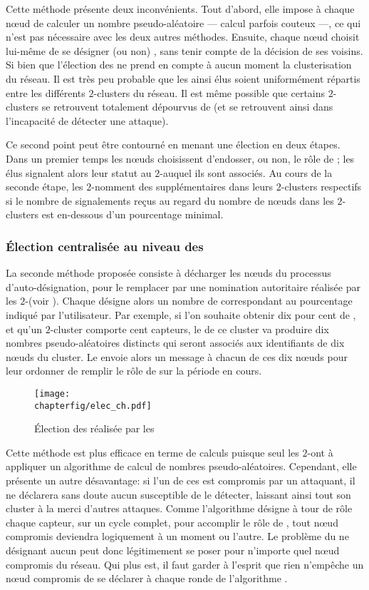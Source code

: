Cette méthode présente deux inconvénients.
Tout d'abord, elle impose à chaque nœud de calculer un nombre pseudo-aléatoire --- calcul parfois couteux ---, ce qui n'est pas nécessaire avec les deux autres méthodes.
Ensuite, chaque nœud choisit lui-même de se désigner (ou non) \cn, sans tenir compte de la décision de ses voisins.
Si bien que l'élection des \cns ne prend en compte à aucun moment la clusterisation du réseau.
Il est très peu probable que les \cns ainsi élus soient uniformément répartis entre les différents $2$-clusters du réseau.
Il est même possible que certains $2$-clusters se retrouvent totalement dépourvus de \cns (et se retrouvent ainsi dans l'incapacité de détecter une attaque).

Ce second point peut être contourné en menant une élection en deux étapes.
Dans un premier temps les nœuds choisissent d'endosser, ou non, le rôle de \cn; les \cns élus signalent alors leur statut au $2$-\CH auquel ils sont associés.
Au cours de la seconde étape, les $2$-\CH nomment des \cns supplémentaires dans leurs $2$-clusters respectifs si le nombre de signalements reçus au regard du nombre de nœuds dans les $2$-clusters est en-dessous d'un pourcentage minimal.

        \subsubsection{Élection centralisée au niveau des \chs}
La seconde méthode proposée consiste à décharger les nœuds du processus d'auto-désignation, pour le remplacer par une nomination autoritaire réalisée par les $2$-\chs (voir ).
Chaque \CH désigne alors un nombre de \cns correspondant au pourcentage indiqué par l'utilisateur.
Par exemple, si l'on souhaite obtenir dix pour cent de \cns, et qu'un $2$-cluster comporte cent capteurs, le \CH de ce cluster va produire dix nombres pseudo-aléatoires distincts qui seront associés aux identifiants de dix nœuds du cluster.
Le \CH envoie alors un message à chacun de ces dix nœuds pour leur ordonner de remplir le rôle de \cn sur la période en cours.
\begin{figure}[ht]
    \centering
    \texttt{[image: \\chapterfig/elec\_ch.pdf]}
    \caption{Élection des \cns réalisée par les \chs}\label{sa:fig:elecch}
\end{figure}

Cette méthode est plus efficace en terme de calculs puisque seul les $2$-\CH ont à appliquer un algorithme de calcul de nombres pseudo-aléatoires.
Cependant, elle présente un autre désavantage: si l'un de ces \CH est compromis par un attaquant, il ne déclarera sans doute aucun \cn susceptible de le détecter, laissant ainsi tout son cluster à la merci d'autres attaques.
Comme l'algorithme \leach désigne à tour de rôle chaque capteur, sur un cycle complet, pour accomplir le rôle de \CH, tout nœud compromis deviendra logiquement \CH à un moment ou l'autre.
Le problème du \CH ne désignant aucun \cn peut donc légitimement se poser pour n'importe quel nœud compromis du réseau.
Qui plus est, il faut garder à l'esprit que rien n'empêche un nœud compromis de se déclarer \ch à chaque ronde de l'algorithme \leach.

